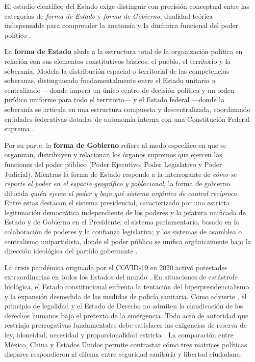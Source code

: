 \documentclass[12pt,spanish,letterpaper,oneside]{article}
\begin{document}
El estudio cient\'ifico del Estado exige distinguir con precisi\'on conceptual entre las categor\'ias de \emph{forma de Estado} y \emph{forma de Gobierno}, dualidad te\'orica indispensable para comprender la anatom\'ia y la din\'amica funcional del poder pol\'itico \citep{andrade2003}.

La \textbf{forma de Estado} alude a la estructura total de la organizaci\'on pol\'itica en relaci\'on con sus elementos constitutivos b\'asicos: el pueblo, el territorio y la soberan\'ia. Modela la distribuci\'on espacial o territorial de las competencias soberanas, distinguiendo fundamentalmente entre el Estado unitario o centralizado ---donde impera un \'unico centro de decisi\'on pol\'itica y un orden jur\'idico uniforme para todo el territorio--- y el Estado federal ---donde la soberan\'ia se articula en una estructura compuesta y descentralizada, coordinando entidades federativas dotadas de autonom\'ia interna con una Constituci\'on Federal suprema \citep{kriele2022,tenaRamirez1999}.

Por su parte, la \textbf{forma de Gobierno} refiere al modo espec\'ifico en que se organizan, distribuyen y relacionan los \'organos supremos que ejercen las funciones del poder p\'ublico (Poder Ejecutivo, Poder Legislativo y Poder Judicial). Mientras la forma de Estado responde a la interrogante de \emph{c\'omo se reparte el poder en el espacio geogr\'afico y poblacional}, la forma de gobierno dilucida \emph{qui\'en ejerce el poder y bajo qu\'e sistema org\'anico de control rec\'iproco} \citep{bobbio1991,andrade2003}. Entre estas destacan el sistema presidencial, caracterizado por una estricta legitimaci\'on democr\'atica independiente de los poderes y la jefatura unificada de Estado y de Gobierno en el Presidente; el sistema parlamentario, basado en la colaboraci\'on de poderes y la confianza legislativa; y los sistemas de asamblea o centralismo unipartidista, donde el poder p\'ublico se unifica org\'anicamente bajo la direcci\'on ideol\'ogica del partido gobernante \citep{kelsen2020teoria}.

La crisis pand\'emica originada por el COVID-19 en 2020 activ\'o potestades extraordinarias en todos los Estados del mundo \citep{whoCovidPandemic2020}. En situaciones de cat\'astrofe biol\'ogica, el Estado constitucional enfrenta la tentaci\'on del hiperpresidencialismo y la expansi\'on desmedida de las medidas de polic\'ia sanitaria. Como advierte \citet{garciaRicci2011}, el principio de legalidad y el Estado de Derecho no admiten la claudicaci\'on de los derechos humanos bajo el pretexto de la emergencia. Todo acto de autoridad que restrinja prerrogativas fundamentales debe satisfacer las exigencias de reserva de ley, idoneidad, necesidad y proporcionalidad estricta \citep{carbonell2019,ferrajoli2001}. La comparaci\'on entre M\'exico, China y Estados Unidos permite contrastar c\'omo tres matrices pol\'iticas dispares respondieron al dilema entre seguridad sanitaria y libertad ciudadana.
\end{document}
